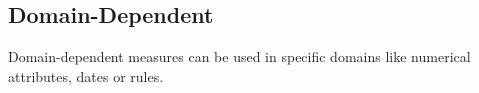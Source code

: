 \subsection{Domain-Dependent}
Domain-dependent measures can be used in specific domains like numerical attributes, dates or rules.
